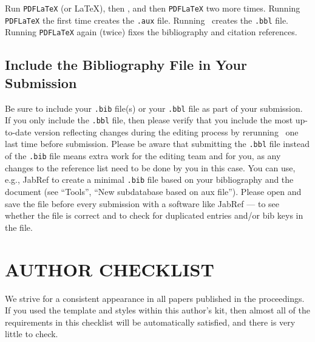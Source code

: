 \documentclass{wscpaperproc}
\theoremstyle{wsc}
\begin{document}
Run {\tt PDFLaTeX} (or \LaTeX), then \BibTeX, and then {\tt PDFLaTeX} two more times. Running {\tt PDFLaTeX} the first time creates the \texttt{.aux} file. Running \BibTeX\ creates the {\tt .bbl} file.  Running {\tt PDFLaTeX} again (twice) fixes the bibliography and citation references.

\subsection{Include the Bibliography File in Your Submission}
\label{sec:submitbib}

Be sure to include your {\tt .bib} file(s) or your {\tt .bbl} file as part of your submission. If you only include the {\tt .bbl} file, then please verify that you include the most up-to-date version reflecting changes during the editing process by rerunning \BibTeX\ one last time before submission.
Please be aware that submitting the {\tt .bbl} file instead of the {\tt .bib} file means extra work for the editing team and for you, as any changes to the reference list need to be done by you in this case.
You can use, e.g., JabRef to create a minimal {\tt .bib} file based on your bibliography and the document (see ``Tools'', ``New subdatabase based on aux file'').
Please open and save the file before every submission with a software like JabRef --- to see whether the file is correct and to check for duplicated entries and/or bib keys in the file.

\section{AUTHOR CHECKLIST}
We strive for a consistent appearance in all papers published in the proceedings. If you used the template and styles within this author's kit, then almost all of the requirements in this checklist will be automatically satisfied, and there is very little to check.
\end{document}
